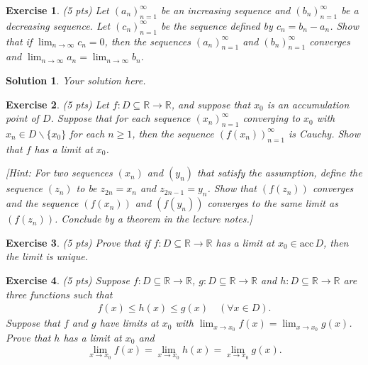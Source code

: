 \documentclass[12pt]{article}
\newcommand{\bR}{\mathbb{R}}
\newcommand{\ra}{\rightarrow}
\theoremstyle{plain}
\newtheorem{exer}{\textbf{Exercise}}}
\theoremstyle{plain}
\newtheorem*{sol}{\textbf{Solution}}}
\begin{document}
\begin{exer}
(5 pts)
Let $(a_n)_{n = 1}^\infty$ be an increasing sequence and $(b_n)_{n = 1}^\infty$ be a decreasing sequence. Let $(c_n)_{n = 1}^\infty$ be the sequence defined by $c_n = b_n - a_n$. Show that if $\lim_{n \ra \infty} c_n = 0$, then the sequences $(a_n)_{n = 1}^\infty$ and $(b_n)_{n = 1}^\infty$ converges and $\lim_{n \ra \infty} a_n = \lim_{n \ra \infty} b_n$.
\end{exer}
\begin{sol}
Your solution here.
\end{sol}

\begin{exer}
(5 pts)
Let $f: D \subseteq \bR \ra \bR$, and suppose that $x_0$ is an accumulation point of $D$. Suppose that for each sequence $(x_n)_{n = 1}^\infty$ converging to $x_0$ with $x_n \in D\backslash \{ x_0 \}$ for each $n \geq 1$, then the sequence $(f(x_n))_{n = 1}^\infty$ is Cauchy. Show that $f$ has a limit at $x_0$.

[Hint: For two sequences $(x_n)$ and $(y_n)$ that satisfy the assumption, define the sequence $(z_n)$ to be $z_{2n} = x_n$ and $z_{2n - 1} = y_n$. Show that $(f(z_n))$ converges and the sequence $(f(x_n))$ and $(f(y_n))$ converges to the same limit as $(f(z_n))$. Conclude by a theorem in the lecture notes.]
\end{exer}

\begin{exer}
(5 pts)
Prove that if $f : D \subseteq \bR \ra \bR$ has a limit at $x_0 \in \mathrm{acc}\, D$, then the limit is unique.
\end{exer}

\begin{exer}
(5 pts)
Suppose $f: D \subseteq \bR \ra \bR$, $g: D \subseteq \bR \ra \bR$ and $h : D \subseteq \bR \ra \bR$ are three functions such that
	\begin{align*}
	f(x) \leq h(x) \leq g(x) \quad (\forall x \in D ) .
	\end{align*}
Suppose that $f$ and $g$ have limits at $x_0$ with $\lim_{x \ra x_0} f(x) = \lim_{x \ra x_0} g(x)$. Prove that $h$ has a limit at $x_0$ and
	$$
	\lim_{x \ra x_0} f(x) = \lim_{x \ra x_0} h(x) = \lim_{x \ra x_0} g(x) .
	$$
\end{exer}
\end{document}
